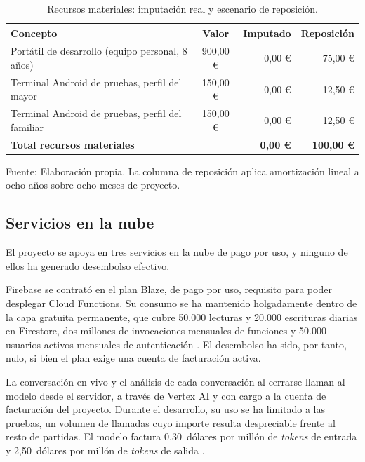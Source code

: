 \begin{table}[htbp]
    \centering
    \caption{Recursos materiales: imputación real y escenario de reposición.}
    \label{tab:coste-material}
    \begin{tabularx}{\textwidth}{@{}>{\RaggedRight\arraybackslash}X c r r@{}}
        \toprule
        \textbf{Concepto} & \textbf{Valor} & \textbf{Imputado} & \textbf{Reposición} \\
        \midrule
        Portátil de desarrollo (equipo personal, 8 años) & 900,00 € & 0,00 € & 75,00 € \\
        Terminal Android de pruebas, perfil del mayor    & 150,00 € & 0,00 € & 12,50 € \\
        Terminal Android de pruebas, perfil del familiar & 150,00 € & 0,00 € & 12,50 € \\
        \midrule
        \textbf{Total recursos materiales}               &          & \textbf{0,00 €} & \textbf{100,00 €} \\
        \bottomrule
    \end{tabularx}

    \vspace{2pt}
    {\footnotesize Fuente: Elaboración propia. La columna de reposición aplica amortización lineal a ocho años sobre ocho meses de proyecto.}
\end{table}

\subsection{Servicios en la nube}

El proyecto se apoya en tres servicios en la nube de pago por uso, y ninguno de ellos ha generado desembolso efectivo.

Firebase se contrató en el plan Blaze, de pago por uso, requisito para poder desplegar Cloud Functions. Su consumo se ha mantenido holgadamente dentro de la capa gratuita permanente, que cubre 50.000 lecturas y 20.000 escrituras diarias en Firestore, dos millones de invocaciones mensuales de funciones y 50.000 usuarios activos mensuales de autenticación \citep{FirebasePricing}. El desembolso ha sido, por tanto, nulo, si bien el plan exige una cuenta de facturación activa.

La conversación en vivo y el análisis de cada conversación al cerrarse llaman al modelo  desde el servidor, a través de Vertex AI y con cargo a la cuenta de facturación del proyecto. Durante el desarrollo, su uso se ha limitado a las pruebas, un volumen de llamadas cuyo importe resulta despreciable frente al resto de partidas. El modelo factura 0,30~dólares por millón de \textit{tokens} de entrada y 2,50~dólares por millón de \textit{tokens} de salida \citep{VertexPricing}.

